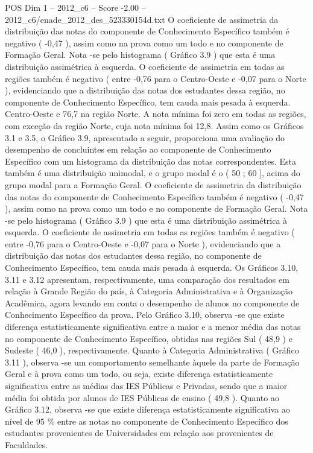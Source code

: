\begin{textsample}{POS Dim 1 – 2012\_c6 – Score -2.00 – 2012\_c6/enade\_2012\_des\_523330154d.txt}
O coeficiente de assimetria da distribuição das notas do componente de Conhecimento Específico também é negativo ( -0,47 ), assim como na prova como um todo e no componente de Formação Geral.
Nota -se pelo histograma ( Gráfico 3.9 ) que esta é uma distribuição assimétrica à esquerda.
O coeficiente de assimetria em todas as regiões também é negativo ( entre -0,76 para o Centro-Oeste e -0,07 para o Norte ), evidenciando que a distribuição das notas dos estudantes dessa região, no componente de Conhecimento Específico, tem cauda mais pesada à esquerda.
Centro-Oeste e 76,7 na região Norte.
A nota mínima foi zero em todas as regiões, com exceção da região Norte, cuja nota mínima foi 12,8.
Assim como os Gráficos 3.1 e 3.5, o Gráfico 3.9, apresentado a seguir, proporciona uma avaliação do desempenho de concluintes em relação ao componente de Conhecimento Específico com um histograma da distribuição das notas correspondentes.
Esta também é uma distribuição unimodal, e o grupo modal é o ( 50 ; 60 ], acima do grupo modal para a Formação Geral.
O coeficiente de assimetria da distribuição das notas do componente de Conhecimento Específico também é negativo ( -0,47 ), assim como na prova como um todo e no componente de Formação Geral.
Nota -se pelo histograma ( Gráfico 3.9 ) que esta é uma distribuição assimétrica à esquerda.
O coeficiente de assimetria em todas as regiões também é negativo ( entre -0,76 para o Centro-Oeste e -0,07 para o Norte ), evidenciando que a distribuição das notas dos estudantes dessa região, no componente de Conhecimento Específico, tem cauda mais pesada à esquerda.
Os Gráficos 3.10, 3.11 e 3.12 apresentam, respectivamente, uma comparação dos resultados em relação à Grande Região do país, à Categoria Administrativa e à Organização Acadêmica, agora levando em conta o desempenho de alunos no componente de Conhecimento Específico da prova.
Pelo Gráfico 3.10, observa -se que existe diferença estatisticamente significativa entre a maior e a menor média das notas no componente de Conhecimento Específico, obtidas nas regiões Sul ( 48,9 ) e Sudeste ( 46,0 ), respectivamente.
Quanto à Categoria Administrativa ( Gráfico 3.11 ), observa -se um comportamento semelhante àquele da parte de Formação Geral e à prova como um todo, ou seja, existe diferença estatisticamente significativa entre as médias das IES Públicas e Privadas, sendo que a maior média foi obtida por alunos de IES Públicas de ensino ( 49,8 ).
Quanto ao Gráfico 3.12, observa -se que existe diferença estatisticamente significativa ao nível de 95 \% entre as notas no componente de Conhecimento Específico dos estudantes provenientes de Universidades em relação aos provenientes de Faculdades.

\end{textsample}
